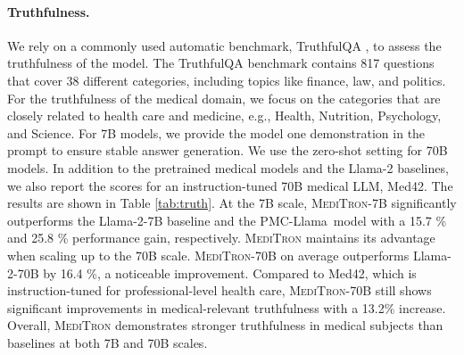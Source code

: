 \documentclass{article}
\newcommand{\llama}{\textnormal{Llama}}
\newcommand{\mtron}{\textsc{MediTron}\xspace}
\newcommand{\mtrona}{\textsc{MediTron-7B}\xspace}
\newcommand{\mtronb}{\textsc{MediTron-70B}\xspace}
\begin{document}
\paragraph{Truthfulness.} We rely on a commonly used automatic benchmark, TruthfulQA \citep{lin-etal-2022-truthfulqa}, to assess the truthfulness of the model. The TruthfulQA benchmark contains 817 questions that cover 38 different categories, including topics like finance, law, and politics. For the truthfulness of the medical domain, we focus on the categories that are closely related to health care and medicine, e.g., Health, Nutrition, Psychology, and Science. For 7B models, we provide the model one demonstration in the prompt to ensure stable answer generation. We use the zero-shot setting for 70B models. In addition to the pretrained medical models and the \llama-2 baselines, we also report the scores for an instruction-tuned 70B medical LLM, Med42. The results are shown in Table \ref{tab:truth}. At the 7B scale, \mtrona significantly outperforms the \llama-2-7B baseline and the PMC-\llama\ model with a 15.7 \% and 25.8 \% performance gain, respectively. \mtron maintains its advantage when scaling up to the 70B scale. \mtronb on average outperforms \llama-2-70B by 16.4 \%, a noticeable improvement. Compared to Med42, which is instruction-tuned for professional-level health care, \mtronb still shows significant improvements in medical-relevant truthfulness with a 13.2\% increase. Overall, \mtron demonstrates stronger truthfulness in medical subjects than baselines at both 7B and 70B scales.
\end{document}
